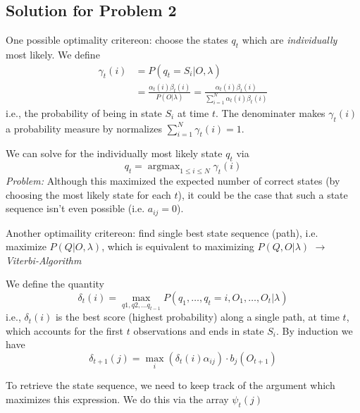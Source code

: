 \documentclass{scrartcl}
\DeclareMathOperator*{\argmax}{argmax} %
\begin{document}
\begin{appendices}
\subsection{Solution for Problem 2}
One possible optimality critereon: choose the states \(q_t\) which are \textit{individually} most likely. We define
\begin{align*}
    \gamma_t(i) &= P(q_t=S_i|O, \lambda)\\
    &= \frac{\alpha_t(i)\beta_t(i)}{P(O|\lambda)} = \frac{\alpha_t(i)\beta_t(i)}{\sum_{i=1}^N \alpha_t(i) \beta_t(i)} 
\end{align*}
i.e., the probability of being in state \(S_i\) at time \(t\). The denominater makes \(\gamma_t(i)\) a probability measure by normalizes \(\sum_{i=1}^N \gamma_t(i) = 1\).

We can solve for the individually most likely state \(q_t\) via
\[q_t = \argmax_{1 \leq i \leq N} \gamma_t(i)\]
\textit{Problem:} Although this maximized the expected number of correct states (by choosing the most likely state for each \(t\)), it could be the case that such a state sequence isn't even possible (i.e. \(a_{ij} = 0\)).

Another optimaility critereon: find single best state sequence (path), i.e. maximize \(P(Q|O, \lambda)\), which is equivalent to maximizing \(P(Q, O|\lambda)\) \(\rightarrow\) \textit{Viterbi-Algorithm}

We define the quantity
\[\delta_t (i) = \max_{q1, q2, \dots q_{t-1}} P(q_1, \dots, q_t=i, O_1, \dots, O_t|\lambda)\]
i.e., \(\delta_t(i)\) is the best score (highest probability) along a single path, at time \(t\), which accounts for the first \(t\) observations and ends in state \(S_i\). By induction we have
\[\delta_{t+1}(j) = \max_i (\delta_t(i) \alpha_{ij}) \cdot b_j(O_{t+1})\]

To retrieve the state sequence, we need to keep track of the argument which maximizes this expression. We do this via the array \(\psi_t(j)\)


\end{appendices}
\end{document}
